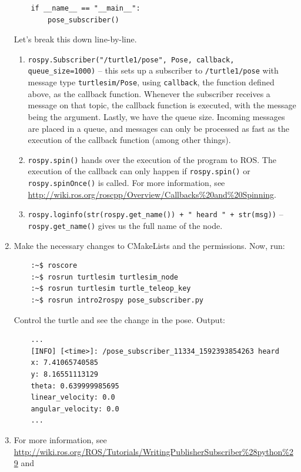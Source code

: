 \documentclass{article}
\begin{document}
\begin{enumerate}
\begin{verbatim}
    if __name__ == "__main__":
        pose_subscriber()
        \end{verbatim}
        Let's  break this down line-by-line.
        \begin{enumerate}
            \item \texttt{rospy.Subscriber("/turtle1/pose", Pose, callback, queue_size=1000)}
            -- this sets up a subscriber to \texttt{/turtle1/pose} with message type 
            \texttt{turtlesim/Pose}, using \texttt{callback}, the function defined above, as 
            the callback function. Whenever the subscriber receives a message on that
            topic, the callback function is executed, with the message being the argument. Lastly,
            we have the queue size. Incoming messages are placed in a queue, and messages can only 
            be processed as fast as the execution of the callback function (among other things).
            \item \texttt{rospy.spin()} hands over the execution of the program to ROS.
            The execution of the callback can only happen if \texttt{rospy.spin()} or 
            \texttt{rospy.spinOnce()} is called. For more information, see 
            \url{http://wiki.ros.org/roscpp/Overview/Callbacks%20and%20Spinning}.
            \item \texttt{rospy.loginfo(str(rospy.get_name()) + " heard " + str(msg))} -- 
            \texttt{rospy.get\_name()} gives us the full name of the node.
        \end{enumerate}
        \item Make the necessary changes to CMakeLists and the permissions. Now, run:
        \begin{verbatim}
    :~$ roscore
    :~$ rosrun turtlesim turtlesim_node 
    :~$ rosrun turtlesim turtle_teleop_key
    :~$ rosrun intro2rospy pose_subscriber.py
        \end{verbatim}
        Control the turtle and see the change in the pose. Output:
        \begin{verbatim}
    ...    
    [INFO] [<time>]: /pose_subscriber_11334_1592393854263 heard 
    x: 7.41065740585
    y: 8.16551113129
    theta: 0.639999985695
    linear_velocity: 0.0
    angular_velocity: 0.0
    ...
        \end{verbatim}
    \item For more information, see \url{http://wiki.ros.org/ROS/Tutorials/WritingPublisherSubscriber%28python%29}
    and 
    \end{enumerate}
\end{document}
